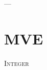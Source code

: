 
\begin{savequote}[85mm]
          {\color{stdgrey}---}
      
\end{savequote}
      
\chapter{MVE}
\label{chap:4rd_chapter}
      
 \lettrine[lines=4,findent=5pt]{\textcolor{stdgrey}{I}}{nteger} 
      


%   

